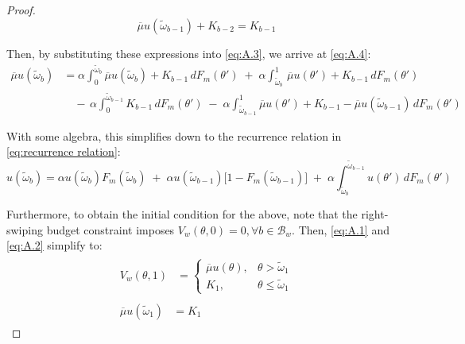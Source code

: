 \begin{proof}
$$
\overline\mu u(\widetilde\omega_{b-1}) +K_{b-2}=K_{b-1}
$$

Then, by substituting these expressions into \eqref{eq:A.3}, we arrive at \eqref{eq:A.4}: 
\begin{equation}\label{eq:A.4}
    \begin{split}
        \overline\mu u(\widetilde\omega_b) &=\alpha \int^{\widetilde\omega_b}_0 \overline\mu u(\widetilde\omega_b) +K_{b-1}\,dF_m(\theta') \;+\; \alpha \int^1_{\widetilde\omega_b} \,\overline\mu u(\theta') + K_{b-1}\,dF_m(\theta')\\ 
                                           & \quad -\,\alpha \int^{\widetilde\omega_{b-1}}_0 K_{b-1}\,dF_m(\theta') \;-\; \alpha \int^1_{\widetilde\omega_{b-1}} \overline\mu u(\theta') + K_{b-1}-\overline\mu u(\widetilde\omega_{b-1})\,dF_m(\theta')
    \end{split}
\end{equation}

With some algebra, this simplifies down to the recurrence relation in \autoref{eq:recurrence relation}:  
\begin{equation}
    u(\widetilde\omega_b)=\alpha   u(\widetilde\omega_b)F_m(\widetilde\omega_b) \;+\; \alpha  u(\widetilde\omega_{b-1})\Big[1  - F_m(\widetilde\omega_{b-1})\Big] \;+\; \alpha\int^{\widetilde\omega_{b-1}}_{\widetilde\omega_b} u(\theta') \,dF_m(\theta') 
\end{equation}

Furthermore, to obtain the initial condition for the above, note that the right-swiping budget constraint imposes $V_w(\theta,0)=0, \forall b\in \mathcal{B}_w$. Then, \eqref{eq:A.1} and \eqref{eq:A.2} simplify to: 
\begin{align}
    \begin{split}\label{eq:A.5} 
        V_w(\theta, 1)&=\begin{cases} 
            \overline\mu u(\theta),& \theta> \widetilde \omega_1 \\  
            K_1,& \theta\leq\widetilde \omega_1
        \end{cases}
    \end{split}\\ 
    \begin{split}\label{eq:A.6}
        \overline\mu u(\widetilde\omega_1) &= K_1 
    \end{split} 
\end{align}


\end{proof}
